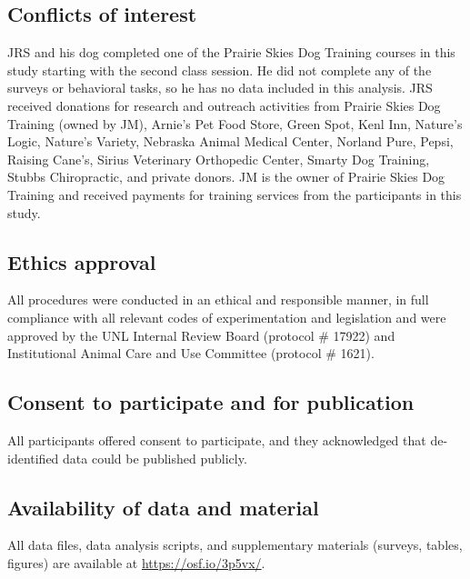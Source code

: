\documentclass[
  english,
  ,pub,floatsintext]{apa6}
\begin{document}
\hypertarget{conflicts-of-interest}{%
\subsection{Conflicts of interest}\label{conflicts-of-interest}}

JRS and his dog completed one of the Prairie Skies Dog Training courses in this study starting with the second class session. He did not complete any of the surveys or behavioral tasks, so he has no data included in this analysis. JRS received donations for research and outreach activities from Prairie Skies Dog Training (owned by JM), Arnie's Pet Food Store, Green Spot, Kenl Inn, Nature's Logic, Nature's Variety, Nebraska Animal Medical Center, Norland Pure, Pepsi, Raising Cane's, Sirius Veterinary Orthopedic Center, Smarty Dog Training, Stubbs Chiropractic, and private donors. JM is the owner of Prairie Skies Dog Training and received payments for training services from the participants in this study.

\hypertarget{ethics-approval}{%
\subsection{Ethics approval}\label{ethics-approval}}

All procedures were conducted in an ethical and responsible manner, in full compliance with all relevant codes of experimentation and legislation and were approved by the UNL Internal Review Board (protocol \# 17922) and Institutional Animal Care and Use Committee (protocol \# 1621).

\hypertarget{consent-to-participate-and-for-publication}{%
\subsection{Consent to participate and for publication}\label{consent-to-participate-and-for-publication}}

All participants offered consent to participate, and they acknowledged that de-identified data could be published publicly.

\hypertarget{availability-of-data-and-material}{%
\subsection{Availability of data and material}\label{availability-of-data-and-material}}

All data files, data analysis scripts, and supplementary materials (surveys, tables, figures) are available at \url{https://osf.io/3p5vx/}.
\end{document}
